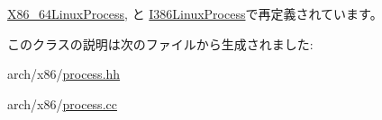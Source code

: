 \hyperlink{classX86ISA_1_1X86__64LinuxProcess_a08d67a94820b75842e07f030e548372e}{X86\_\-64LinuxProcess}, と \hyperlink{classX86ISA_1_1I386LinuxProcess_a08d67a94820b75842e07f030e548372e}{I386LinuxProcess}で再定義されています。

このクラスの説明は次のファイルから生成されました:\begin{DoxyCompactItemize}
\item 
arch/x86/\hyperlink{arch_2x86_2process_8hh}{process.hh}\item 
arch/x86/\hyperlink{arch_2x86_2process_8cc}{process.cc}\end{DoxyCompactItemize}
